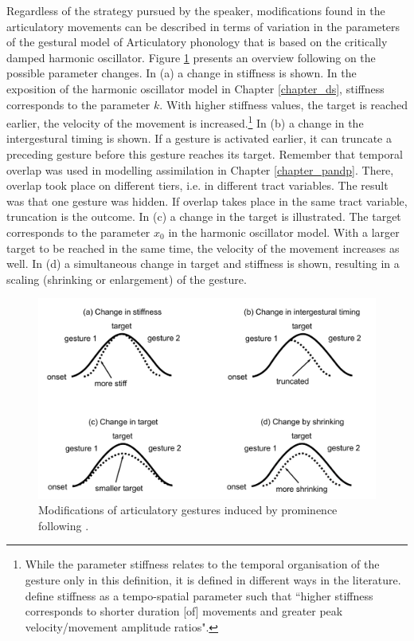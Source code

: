 Regardless of the strategy pursued by the speaker, modifications found in the articulatory movements can be described in terms of variation in the parameters of the gestural model of Articulatory phonology that is based on the critically damped harmonic oscillator. Figure \ref{fig:cho_2006} presents an overview following \citet{Cho2006} on the possible parameter changes. In (a) a change in stiffness is shown. In the exposition of the harmonic oscillator model in Chapter \ref{chapter_ds}, stiffness corresponds to the parameter $k$. With higher stiffness values, the target is reached earlier, the velocity of the movement is increased.\footnote{While the parameter stiffness relates to the temporal organisation of the gesture only in this definition, it is defined in different ways in the literature. \citet[465]{MunhallOstryParush1985} define stiffness as a tempo-spatial parameter such that  ``higher stiffness corresponds to shorter duration [of] movements and greater peak velocity/movement amplitude ratios".} In (b) a change in the intergestural timing is shown. If a gesture is activated earlier, it can truncate a preceding gesture before this gesture reaches its target. Remember that temporal overlap was used in modelling assimilation in Chapter \ref{chapter_pandp}. There, overlap took place on different tiers, i.e. in different tract variables. The result was that one gesture was hidden. If overlap takes place in the same tract variable, truncation is the outcome. In (c) a change in the target is illustrated. The target corresponds to the parameter $x_0$ in the harmonic oscillator model. With a larger target to be reached in the same time, the velocity of the movement increases as well. In (d) a simultaneous change in target and stiffness is shown, resulting in a scaling (shrinking or enlargement) of the gesture.

\begin{figure}[t]
\includegraphics[width=\textwidth]{figures/ch4/cho_modifications.pdf}
\caption{Modifications of articulatory gestures induced by prominence following \citet{Cho2006}.}
\label{fig:cho_2006}
\end{figure}

